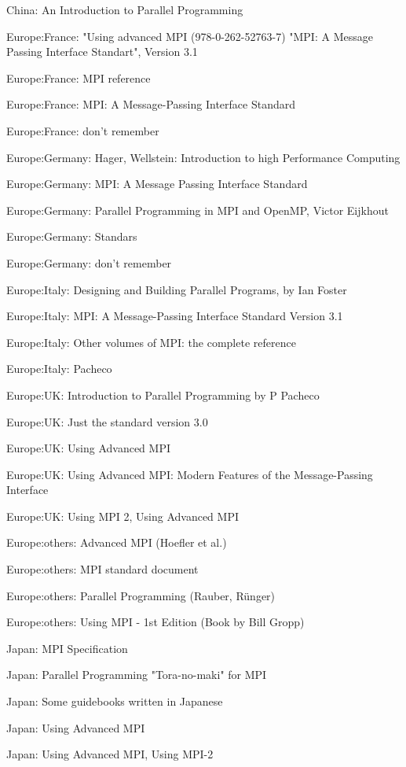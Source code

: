 \item China: An Introduction to Parallel Programming
\item Europe:France: "Using advanced MPI (978-0-262-52763-7)  "MPI: A Message Passing Interface Standart", Version 3.1
\item Europe:France: MPI reference
\item Europe:France: MPI: A Message-Passing Interface Standard
\item Europe:France: don't remember
\item Europe:Germany: Hager, Wellstein: Introduction to high Performance Computing
\item Europe:Germany: MPI: A Message Passing Interface Standard
\item Europe:Germany: Parallel Programming in MPI and OpenMP, Victor Eijkhout
\item Europe:Germany: Standars
\item Europe:Germany: don't remember
\item Europe:Italy: Designing and Building Parallel Programs, by Ian Foster
\item Europe:Italy: MPI: A Message-Passing Interface Standard Version 3.1
\item Europe:Italy: Other volumes of MPI: the complete reference
\item Europe:Italy: Pacheco
\item Europe:UK: Introduction to Parallel Programming by P Pacheco
\item Europe:UK: Just the standard version 3.0
\item Europe:UK: Using Advanced MPI
\item Europe:UK: Using Advanced MPI: Modern Features of the Message-Passing Interface
\item Europe:UK: Using MPI 2, Using Advanced MPI
\item Europe:others: Advanced MPI (Hoefler et al.)
\item Europe:others: MPI standard document
\item Europe:others: Parallel Programming (Rauber, Rünger)
\item Europe:others: Using MPI - 1st Edition (Book by Bill Gropp)
\item Japan: MPI Specification
\item Japan: Parallel Programming "Tora-no-maki" for MPI
\item Japan: Some guidebooks written in Japanese
\item Japan: Using Advanced MPI
\item Japan: Using Advanced MPI, Using MPI-2
